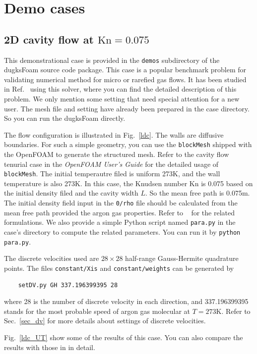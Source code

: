 \chapter{Demo cases}
\section{2D cavity flow at $\text{Kn}=0.075$}
\label{sec_cavity}
This demonstrational case is provided in the \verb|demos| subdirectory of the dugksFoam source code package.
This case is a popular benchmark problem for validating numerical method for micro or rarefied gas flows.
It has been studied in Ref.~\cite{zhulh15} using this solver,
where you can find the detailed description of this problem.
We only mention some setting that need special attention for a new user.
The mesh file and setting have already been prepared in the case directory.
So you can run the dugksFoam directly.

The flow configuration is illustrated in Fig.~\ref{ldc}.
The walls are diffusive boundaries.
For such a simple geometry, you can use the \verb|blockMesh| shipped with the OpenFOAM to generate the structured mesh.
Refer to the cavity flow tenurial case in the \emph{OpenFOAM User's Guide} for the detailed usage of \verb|blockMesh|.
The initial temperautre filed is uniform 273K, and the wall temperature is also 273K.
In this case, the Knudsen number Kn is 0.075 based on the initial density filed and the cavity width $L$.
So the mean free path is 0.075m.
The initial density field input in the \verb|0/rho| file should be calculated from the mean free path provided the argon gas properties.
Refer to ~\cite{zhulh15} for the related formulations.
We also provide a simple Python script named \verb|para.py| in the case's directory to compute the related parameters.
You can run it by \verb|python para.py|.


The discrete velocities used are $28\times28$ half-range Gauss-Hermite quadrature points.
The files \verb|constant/Xis| and \verb|constant/weights| can be generated by
\begin{verbatim}
    setDV.py GH 337.196399395 28
\end{verbatim}
where 28 is the number of discrete velocity in each direction, and 337.196399395 stands for the most probable speed of argon gas molecular at $T=273$K.
Refer to Sec.~\ref{sec_dv} for more details about settings of discrete velocities.

Fig.~\ref{ldc_UT} show some of the results of this case.
You can also compare the results with those in \cite{zhulh15} in detail.

